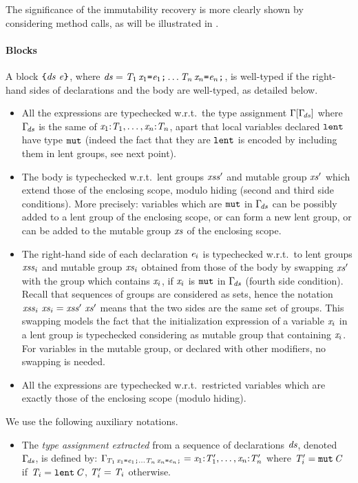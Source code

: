 {The significance of the {immutability recovery} is more clearly shown by considering method calls, as will be illustrated in .

\paragraph{Blocks}
{A block $\Block{\decs}{\e}$, where $\decs=\Dec{\T_1}{\x_1}{\e_1}\ldots\Dec{\T_n}{\x_n}{\e_n}$, is well-typed if the right-hand sides of declarations and the body are well-typed, as detailed below.
\begin{itemize}
\item All the expressions are typechecked w.r.t.\ the type assignment $\SubstFun{\Gamma}{\TypeEnv{\decs}}$ where $\TypeEnv{\decs}$  is the same of $\TypeDec{\T_1}{\x_1},\ldots,\TypeDec{\T_n}{\x_n}$, apart that local variables declared $\lent$ have type $\mutable$ (indeed the fact that they are $\lent$ is encoded by  including them in lent groups, see next point).
\item The body is typechecked w.r.t.\ lent groups $\LentLocked'$ and mutable group $\MutGroup'$ which extend those of the enclosing scope, modulo hiding (second and third side conditions). More precisely: variables which are $\mutable$ in $\TypeEnv{\decs}$ can be possibly added to a lent group of the enclosing scope, or can form a new lent group, or can be added to the mutable group $\xs$ of the enclosing scope.
\item The right-hand side of each declaration $\e_i$ is typechecked w.r.t.\ to lent groups $\LentLocked_i$ and mutable group $\xs_i$ obtained from those of the body by swapping $\xs'$ with the group which contains $\x_i$, if $\x_i$ is $\mutable$ in $\TypeEnv{\decs}$ (fourth side condition). Recall that sequences of groups are considered as sets, hence the notation $\LentLocked_i\ \MutGroup_i = \LentLocked'\ \MutGroup'$ means that the two sides are the same set of groups.  This swapping models the fact that the initialization expression of a variable $\x_i$ in a lent group is typechecked considering as mutable group that containing $\x_i$.
For variables in the mutable group, or declared with other modifiers, no swapping is needed.
\item All the expressions are typechecked w.r.t.\ restricted variables which are exactly those of the enclosing scope (modulo hiding).
\end{itemize}
We use the following auxiliary notations.
\begin{itemize}
\item {The {\em type assignment extracted} from a sequence of declarations $\decs$, denoted $\TypeEnv{\decs}$, is defined by: $\TypeEnv{\Dec{\T_1}{\x_1}{\e_1}\ldots\Dec{\T_n}{\x_n}{\e_n}}=\TypeDec{\T'_1}{\x_1},\ldots,\TypeDec{\T'_n}{\x_n}$ where $\T'_i=\Type{\mutable}{\C}$ if  $\T_i=\Type{\lent}{\C}$, $\T'_i=\T_i$ otherwise.}

\end{itemize}}}
